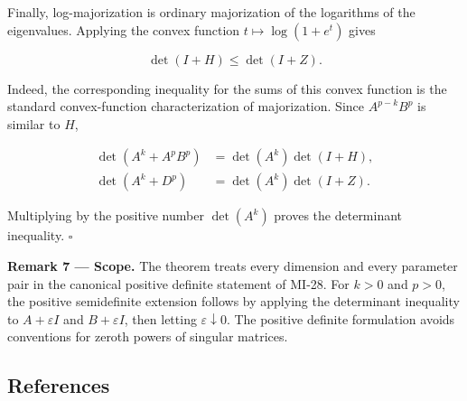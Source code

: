 \documentclass[10pt,a4paper]{article}
\begin{document}
Finally, log-majorization is ordinary majorization of the logarithms of
the eigenvalues. Applying the convex function \(t\mapsto\log(1+e^t)\)
gives

\[
\det(I+H)\le\det(I+Z).
\]

Indeed, the corresponding inequality for the sums of this convex
function is the standard convex-function characterization of
majorization. Since \(A^{p-k}B^p\) is similar to \(H\),

\[
\begin{aligned}
\det(A^k+A^pB^p)&=\det(A^k)\det(I+H),\\
\det(A^k+D^p)&=\det(A^k)\det(I+Z).
\end{aligned}
\]

Multiplying by the positive number \(\det(A^k)\) proves the determinant
inequality. \(\square\)

\textbf{Remark 7 --- Scope.} The theorem treats every dimension and
every parameter pair in the canonical positive definite statement of
MI-28. For \(k>0\) and \(p>0\), the positive semidefinite extension
follows by applying the determinant inequality to \(A+\varepsilon I\)
and \(B+\varepsilon I\), then letting \(\varepsilon\downarrow0\). The
positive definite formulation avoids conventions for zeroth powers of
singular matrices.

\subsection{References}\label{references}
\end{document}
